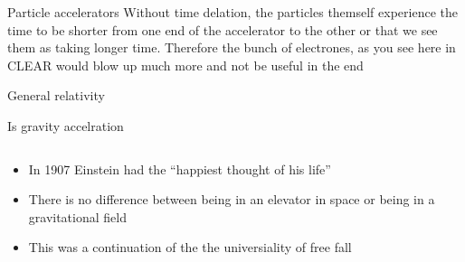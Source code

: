 \documentclass{beamer}
\begin{document}
\begin{frame}{Particle accelerators}
  Without time delation, the particles themself experience the time to be shorter from one end of the accelerator to the other or that we see them as taking longer time. Therefore the bunch of electrones, as you see here in CLEAR would blow up much more and not be useful in the end

\end{frame}


\begin{frame}{General relativity}

  \end{frame}
\begin{frame}{Is gravity accelration}
  \begin{columns}
    \begin{column}{0.5\textwidth}
      \begin{itemize}
      \item{In 1907 Einstein had the ``happiest thought of his life''}
      \item{There is no difference between being in an elevator in space or being in a gravitational field}
      \item{This was a continuation of the the universiality of free fall}
         
        \end{itemize}
         \end{column}

    \begin{column}{0.5\textwidth}
        \begin{tikzpicture}


\end{tikzpicture}
\end{column}
\end{columns}
\end{frame}
\end{document}
